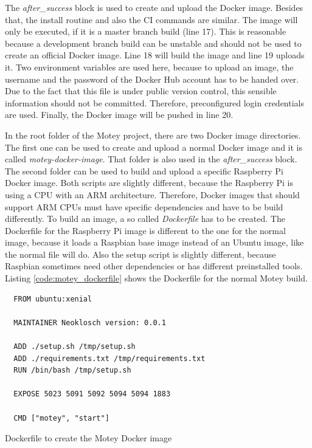 The \textit{after\_success} block is used to create and upload the Docker image.
Besides that, the install routine and also the \ac{CI} commands are similar.
The image will only be executed, if it is a master branch build (line 17).
This is reasonable because a development branch build can be unstable and should not be used to create an official Docker image.
Line 18 will build the image and line 19 uploads it.
Two environment variables are used here, because to upload an image, the username and the password of the Docker Hub account has to be handed over.
Due to the fact that this file is under public version control, this sensible information should not be committed.
Therefore, preconfigured login credentials are used.
Finally, the Docker image will be pushed in line 20.\newline

In the root folder of the Motey project, there are two Docker image directories.
The first one can be used to create and upload a normal Docker image and it is called \textit{motey-docker-image}.
That folder is also used in the \textit{after\_success} block.
The second folder can be used to build and upload a specific Raspberry Pi Docker image.
Both scripts are slightly different, because the Raspberry Pi is using a \ac{CPU} with an ARM architecture.
Therefore, Docker images that should support ARM \acp{CPU} must have specific dependencies and have to be build differently.
To build an image, a so called \textit{Dockerfile} has to be created.
The Dockerfile for the Raspberry Pi image is different to the one for the normal image, because it loads a Raspbian base image instead of an Ubuntu image, like the normal file will do.
Also the setup script is slightly different, because Raspbian sometimes need other dependencies or has different preinstalled tools.
Listing \ref{code:motey_dockerfile} shows the Dockerfile for the normal Motey build.\newline

\begin{listing}[H]
  \begin{verbatim}
  FROM ubuntu:xenial

  MAINTAINER Neoklosch version: 0.0.1

  ADD ./setup.sh /tmp/setup.sh
  ADD ./requirements.txt /tmp/requirements.txt
  RUN /bin/bash /tmp/setup.sh

  EXPOSE 5023 5091 5092 5094 5094 1883

  CMD ["motey", "start"]
  \end{verbatim}
  \caption{Dockerfile to create the Motey Docker image}
  \label{code:motey_dockerfile}
\end{listing}

